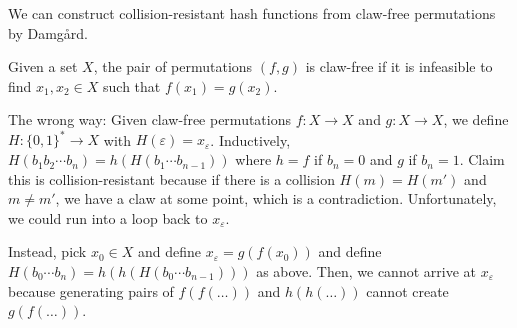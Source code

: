 \documentclass[notes]{agony}
\begin{document}
We can construct collision-resistant hash functions
from claw-free permutations by Damg\aa{}rd.

\begin{defn}
  Given a set $X$, the pair of permutations $(f,g)$ is claw-free if
  it is infeasible to find $x_1,x_2 \in X$ such that $f(x_1) = g(x_2)$.
\end{defn}

The wrong way:
Given claw-free permutations $f : X \to X$ and $g : X \to X$,
we define $H : \{0,1\}^* \to X$ with $H(\varepsilon) = x_\varepsilon$.
Inductively, $H(b_1b_2\cdots b_n) = h(H(b_1\cdots b_{n-1}))$
where $h = f$ if $b_n = 0$ and $g$ if $b_n = 1$.
Claim this is collision-resistant because if there is a collision
$H(m) = H(m')$ and $m \neq m'$, we have a claw at some point,
which is a contradiction.
Unfortunately, we could run into a loop back to $x_\varepsilon$.

Instead, pick $x_0 \in X$ and define $x_\varepsilon = g(f(x_0))$
and define $H(b_0\cdots b_n) = h(h(H(b_0 \cdots b_{n-1})))$ as above.
Then, we cannot arrive at $x_\varepsilon$
because generating pairs of $f(f(\dots))$ and $h(h(\dots))$ cannot create $g(f(\dots))$.
\end{document}
